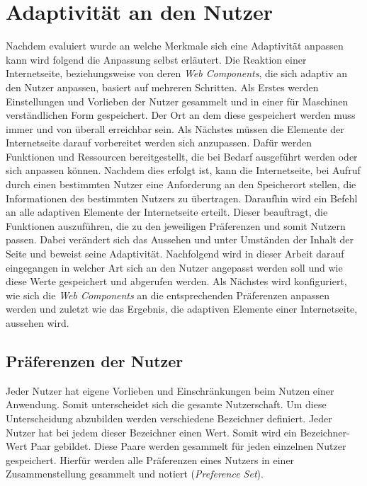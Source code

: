 \documentclass[12pt, paper=a4, bibtotoc, toc=listof, headsepline=true, numbers=endperiod]{scrreprt}
\begin{document}
\chapter{Adaptivität an den Nutzer}
Nachdem evaluiert wurde an welche Merkmale sich eine Adaptivität anpassen kann wird folgend die Anpassung selbst erläutert. Die Reaktion einer Internetseite, beziehungsweise von deren \emph{Web Components}, die sich adaptiv an den Nutzer anpassen, basiert auf mehreren Schritten. Als Erstes werden Einstellungen und Vorlieben der Nutzer gesammelt und in einer für Maschinen verständlichen Form gespeichert. Der Ort an dem diese gespeichert werden muss immer und von überall erreichbar sein. Als Nächstes müssen die Elemente der Internetseite darauf vorbereitet werden sich anzupassen. Dafür werden Funktionen und Ressourcen bereitgestellt, die bei Bedarf ausgeführt werden oder sich anpassen können. Nachdem dies erfolgt ist, kann die Internetseite, bei Aufruf durch einen bestimmten Nutzer eine Anforderung an den Speicherort stellen, die Informationen des bestimmten Nutzers zu übertragen. Daraufhin wird ein Befehl an alle adaptiven Elemente der Internetseite erteilt. Dieser beauftragt, die Funktionen auszuführen, die zu den jeweiligen Präferenzen und somit Nutzern passen. Dabei verändert sich das Aussehen und unter Umständen der Inhalt der Seite und beweist seine Adaptivität.\newline
Nachfolgend wird in dieser Arbeit darauf eingegangen in welcher Art sich an den Nutzer angepasst werden soll und wie diese Werte gespeichert und abgerufen werden. Als Nächstes wird konfiguriert, wie sich die \emph{Web Components} an die entsprechenden Präferenzen anpassen werden und zuletzt wie das Ergebnis, die adaptiven Elemente einer Internetseite, aussehen wird.
\section{Präferenzen der Nutzer}
Jeder Nutzer hat eigene Vorlieben und Einschränkungen beim Nutzen einer Anwendung. Somit unterscheidet sich die gesamte Nutzerschaft. Um diese Unterscheidung abzubilden werden verschiedene Bezeichner definiert. Jeder Nutzer hat bei jedem dieser Bezeichner einen Wert. Somit wird ein Bezeichner-Wert Paar gebildet. Diese Paare werden gesammelt für jeden einzelnen Nutzer gespeichert. Hierfür werden alle Präferenzen eines Nutzers in einer Zusammenstellung gesammelt und notiert (\emph{Preference Set}).
\end{document}
